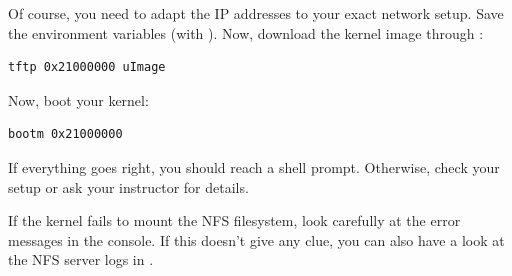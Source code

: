 Of course, you need to adapt the IP addresses to your exact network
setup. Save the environment variables (with ).  Now, download
the kernel image through :

\begin{verbatim}
tftp 0x21000000 uImage
\end{verbatim}

Now, boot your kernel:

\begin{verbatim}
bootm 0x21000000
\end{verbatim}

If everything goes right, you should reach a shell prompt. Otherwise,
check your setup or ask your instructor for details.

If the kernel fails to mount the NFS filesystem, look carefully at the
error messages in the console. If this doesn't give any clue, you can
also have a look at the NFS server logs in .
